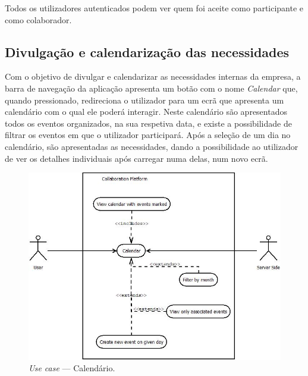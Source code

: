 Todos os utilizadores autenticados podem ver quem foi aceite como participante e como colaborador.

\subsection{Divulgação e calendarização das necessidades}

Com o objetivo de divulgar e calendarizar as necessidades internas da empresa, a barra de navegação da aplicação apresenta um botão com o nome \textit{Calendar} que, quando pressionado, 
redireciona o utilizador para um ecrã que apresenta um calendário com o qual ele poderá interagir. 
Neste calendário são apresentados todos os eventos organizados, na sua respetiva data, e existe a possibilidade de filtrar os eventos em que o utilizador participará. 
Após a seleção de um dia no calendário, são apresentadas as necessidades, dando a possibilidade ao utilizador de ver os detalhes individuais após carregar numa delas, 
num novo ecrã.

\begin{figure}[H]
    \centering
    \includegraphics[scale=0.6]{figures/Calendar use case.jpeg}
    \caption{\textit{Use case} --- Calendário.}\label{fig:uc:calendar}
\end{figure}

